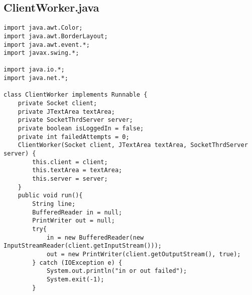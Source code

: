 \documentclass[10pt,a4paper]{article}
\begin{document}
\subsection{ClientWorker.java}
\begin{verbatim}
import java.awt.Color;
import java.awt.BorderLayout;
import java.awt.event.*;
import javax.swing.*;

import java.io.*;
import java.net.*;

class ClientWorker implements Runnable {
    private Socket client;
    private JTextArea textArea;
    private SocketThrdServer server;
    private boolean isLoggedIn = false;
    private int failedAttempts = 0;
    ClientWorker(Socket client, JTextArea textArea, SocketThrdServer server) {
        this.client = client;
        this.textArea = textArea;
        this.server = server;
    }
    public void run(){
        String line;
        BufferedReader in = null;
        PrintWriter out = null;
        try{
            in = new BufferedReader(new InputStreamReader(client.getInputStream()));
            out = new PrintWriter(client.getOutputStream(), true);
        } catch (IOException e) {
            System.out.println("in or out failed");
            System.exit(-1);
        }


\end{verbatim}
\end{document}

